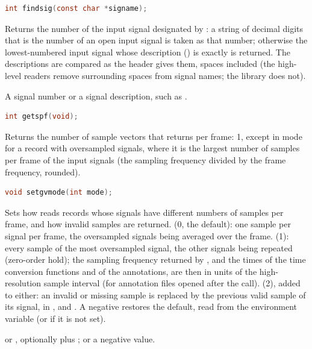 \begin{lstlisting}[language=C,style=signature]
int findsig(const char *signame);
\end{lstlisting}
Returns the number of the input signal designated by : a string
of decimal digits that is the number of an open input signal is taken as that
number; otherwise the lowest-numbered input signal whose description
() is exactly  is returned. The descriptions are
compared as the header gives them, spaces included (the high-level readers
remove surrounding spaces from signal names; the library does not).
\begin{params}
\item[signame] A signal number or a signal description, such as .
\end{params}

\begin{lstlisting}[language=C,style=signature]
int getspf(void);
\end{lstlisting}
Returns the number of sample vectors that  returns per frame:
1, except in  mode for a record with oversampled signals,
where it is the largest number of samples per frame of the input signals (the
sampling frequency divided by the frame frequency, rounded).

\begin{lstlisting}[language=C,style=signature]
void setgvmode(int mode);
\end{lstlisting}
Sets how  reads records whose signals have different numbers of
samples per frame, and how invalid samples are returned.
 (0, the default): one sample per signal per frame, the
oversampled signals being averaged over the frame. 
(1): every sample of the most oversampled signal, the other signals being
repeated (zero-order hold); the sampling frequency returned by
, and the times of the time conversion functions and of
the annotations, are then in units of the high-resolution sample interval
(for annotation files opened after the call).  (2), added to
either: an invalid or missing sample is replaced by the previous valid sample
of its signal, in ,  and . A negative
 restores the default, read from the environment variable
 (or  if it is not set).
\begin{params}
\item[mode]  or , optionally plus
  ; or a negative value.
\end{params}

